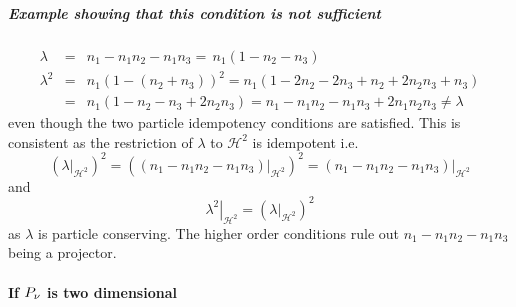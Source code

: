 \documentclass[12pt]{article}
\begin{document}
\subparagraph{Example showing that this condition is not sufficient}

\begin{eqnarray*}
\lambda &=&n_{1}-n_{1}n_{2}-n_{1}n_{3}=\,n_{1}\left( 1-n_{2}-n_{3}\right) \\
\lambda ^{2} &=&n_{1}\left( 1-\left( n_{2}+n_{3}\right) \right)
^{2}=n_{1}\left( 1-2n_{2}-2n_{3}+n_{2}+2n_{2}n_{3}+n_{3}\right) \\
&=&n_{1}\left( 1-n_{2}-n_{3}+2n_{2}n_{3}\right)
=n_{1}-n_{1}n_{2}-n_{1}n_{3}+2n_{1}n_{2}n_{3}\neq \lambda
\end{eqnarray*}%
even though the two particle idempotency conditions are satisfied. This is
consistent as the restriction of $\lambda $ to $\mathcal{H}^{2}$ is
idempotent i.e. 
\begin{equation*}
\left( \left. \lambda \right\vert _{\mathcal{H}^{2}}\right) ^{2}=\left(
\left. \left( n_{1}-n_{1}n_{2}-n_{1}n_{3}\right) \right\vert _{\mathcal{H}%
^{2}}\right) ^{2}=\left. \left( n_{1}-n_{1}n_{2}-n_{1}n_{3}\right)
\right\vert _{\mathcal{H}^{2}}
\end{equation*}%
and 
\begin{equation*}
\left. \lambda ^{2}\right\vert _{\mathcal{H}^{2}}=\left( \left. \lambda
\right\vert _{\mathcal{H}^{2}}\right) ^{2}
\end{equation*}%
as $\lambda $ is particle conserving. The higher order conditions rule out $%
n_{1}-n_{1}n_{2}-n_{1}n_{3}$ being a projector.

\paragraph{If $P_{\mathcal{\protect\nu }}$ is two dimensional}
\end{document}
